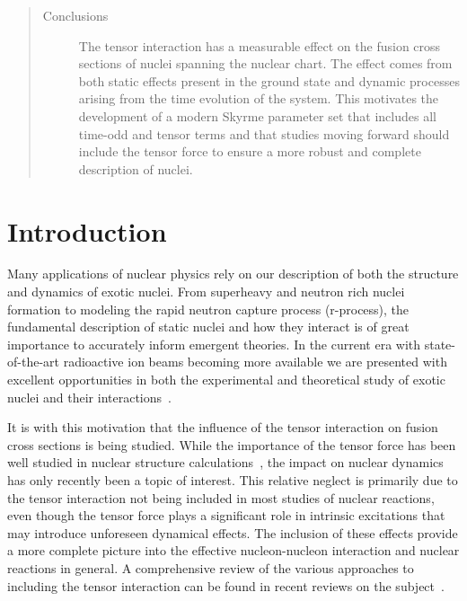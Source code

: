 \documentclass[aps,prc,twocolumn,showpacs,superscriptaddress,longbibliography,floatfix,10pt]{revtex4-1}
\begin{document}
\begin{CJK*}{UTF8}{gbsn}
\begin{abstract}
\begin{description}
\item[Conclusions]
The tensor interaction has a measurable effect on the fusion cross sections of nuclei spanning the nuclear chart.
The effect comes from both static effects present in the ground state and dynamic processes arising from the time evolution of the system.
This motivates the development of a modern Skyrme parameter set that includes all time-odd and tensor terms and that studies moving forward should include the tensor force to ensure a more robust and complete description of nuclei.


\end{description}
\end{abstract}


\maketitle
\end{CJK*}
\section{Introduction}
\label{introduction}
Many applications of nuclear physics rely on our description of both the structure and dynamics of exotic nuclei.
From superheavy and neutron rich nuclei formation to modeling the rapid neutron capture process (r-process), the fundamental description of static nuclei and how they interact is of great importance to accurately inform emergent theories.
In the current era with state-of-the-art radioactive ion beams becoming more available we are presented with excellent opportunities in both the experimental and theoretical study of exotic nuclei and their interactions~\cite{balantekin2014}.

It is with this motivation that the influence of the tensor interaction on fusion cross sections is being studied.
While the importance of the tensor force has been well studied in nuclear structure calculations~\cite{otsuka2005,otsuka2006,lesinski2007,colo2007,bai2010,otsuka2010,brink2018}, the impact on nuclear dynamics has only recently been a topic of interest.
This relative neglect is primarily due to the tensor interaction not being included in most studies of nuclear reactions, even though the tensor force plays a significant role in intrinsic excitations that may introduce unforeseen dynamical effects.
The inclusion of these effects provide a more complete picture into the effective nucleon-nucleon interaction and nuclear reactions in general.
A comprehensive review of the various approaches to including the tensor interaction can be found in recent reviews on the subject~\cite{sagawa2014,stevenson2019}.
\end{document}
